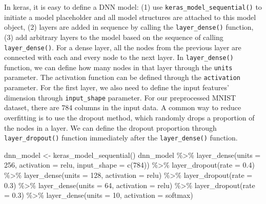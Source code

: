\documentclass[
  12pt,
]{krantz}
\makeatletter
\newenvironment{Shaded}{\begin{snugshade}}{\end{snugshade}}
\newcommand{\AttributeTok}[1]{\textcolor[rgb]{0.61,0.61,0.61}{#1}}
\newcommand{\DecValTok}[1]{\textcolor[rgb]{0.06,0.06,0.06}{#1}}
\newcommand{\FloatTok}[1]{\textcolor[rgb]{0.06,0.06,0.06}{#1}}
\newcommand{\FunctionTok}[1]{\textcolor[rgb]{0,0,0}{#1}}
\newcommand{\NormalTok}[1]{#1}
\newcommand{\OtherTok}[1]{\textcolor[rgb]{0.37,0.37,0.37}{#1}}
\newcommand{\SpecialCharTok}[1]{\textcolor[rgb]{0,0,0}{#1}}
\newcommand{\StringTok}[1]{\textcolor[rgb]{0.5,0.5,0.5}{#1}}
\newenvironment{kframe}{%
\medskip{}
\setlength{\fboxsep}{.8em}
 \def\at@end@of@kframe{}%
 \ifinner\ifhmode%
  \def\at@end@of@kframe{\end{minipage}}%
  \begin{minipage}{\columnwidth}%
 \fi\fi%
 \def\FrameCommand##1{\hskip\@totalleftmargin \hskip-\fboxsep
 \colorbox{shadecolor}{##1}\hskip-\fboxsep
     \hskip-\linewidth \hskip-\@totalleftmargin \hskip\columnwidth}%
 \MakeFramed {\advance\hsize-\width
   \@totalleftmargin\z@ \linewidth\hsize
   \@setminipage}}%
 {\par\unskip\endMakeFramed%
 \at@end@of@kframe}
\renewenvironment{Shaded}{\begin{kframe}}{\end{kframe}}
\makeatother
\begin{document}
In keras, it is easy to define a DNN model: (1) use \texttt{keras\_model\_sequential()} to initiate a model placeholder and all model structures are attached to this model object, (2) layers are added in sequence by calling the \texttt{layer\_dense()} function, (3) add arbitrary layers to the model based on the sequence of calling \texttt{layer\_dense()}. For a dense layer, all the nodes from the previous layer are connected with each and every node to the next layer. In \texttt{layer\_dense()} function, we can define how many nodes in that layer through the \texttt{units} parameter. The activation function can be defined through the \texttt{activation} parameter. For the first layer, we also need to define the input features' dimension through \texttt{input\_shape} parameter. For our preprocessed MNIST dataset, there are 784 columns in the input data. A common way to reduce overfitting is to use the dropout method, which randomly drops a proportion of the nodes in a layer. We can define the dropout proportion through \texttt{layer\_dropout()} function immediately after the \texttt{layer\_dense()} function.

\begin{Shaded}
\begin{Highlighting}[]
\NormalTok{dnn\_model }\OtherTok{\textless{}{-}} \FunctionTok{keras\_model\_sequential}\NormalTok{() }
\NormalTok{dnn\_model }\SpecialCharTok{\%\textgreater{}\%} 
  \FunctionTok{layer\_dense}\NormalTok{(}\AttributeTok{units =} \DecValTok{256}\NormalTok{, }\AttributeTok{activation =} \StringTok{\textquotesingle{}relu\textquotesingle{}}\NormalTok{, }\AttributeTok{input\_shape =} \FunctionTok{c}\NormalTok{(}\DecValTok{784}\NormalTok{)) }\SpecialCharTok{\%\textgreater{}\%} 
  \FunctionTok{layer\_dropout}\NormalTok{(}\AttributeTok{rate =} \FloatTok{0.4}\NormalTok{) }\SpecialCharTok{\%\textgreater{}\%} 
  \FunctionTok{layer\_dense}\NormalTok{(}\AttributeTok{units =} \DecValTok{128}\NormalTok{, }\AttributeTok{activation =} \StringTok{\textquotesingle{}relu\textquotesingle{}}\NormalTok{) }\SpecialCharTok{\%\textgreater{}\%}
  \FunctionTok{layer\_dropout}\NormalTok{(}\AttributeTok{rate =} \FloatTok{0.3}\NormalTok{) }\SpecialCharTok{\%\textgreater{}\%}
  \FunctionTok{layer\_dense}\NormalTok{(}\AttributeTok{units =} \DecValTok{64}\NormalTok{, }\AttributeTok{activation =} \StringTok{\textquotesingle{}relu\textquotesingle{}}\NormalTok{) }\SpecialCharTok{\%\textgreater{}\%}
  \FunctionTok{layer\_dropout}\NormalTok{(}\AttributeTok{rate =} \FloatTok{0.3}\NormalTok{) }\SpecialCharTok{\%\textgreater{}\%}
  \FunctionTok{layer\_dense}\NormalTok{(}\AttributeTok{units =} \DecValTok{10}\NormalTok{, }\AttributeTok{activation =} \StringTok{\textquotesingle{}softmax\textquotesingle{}}\NormalTok{)}
\end{Highlighting}
\end{Shaded}
\end{document}
